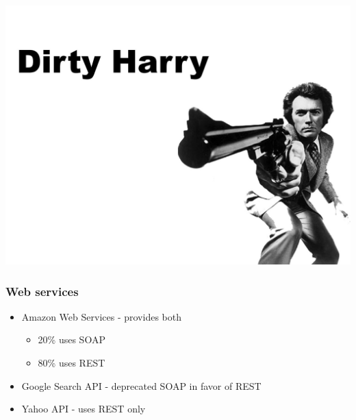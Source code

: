 \begin{frame}[plain]
  \begin{changemargin}{-1cm}{-1cm}
    \begin{center}
      \includegraphics[width=\paperwidth, height=\paperheight, keepaspectratio]{images/dirty-harry.jpg}
    \end{center}
  \end{changemargin}
\end{frame}

\begin{frame}
  \frametitle{Web services}
  \begin{itemize}
  \item Amazon Web Services - provides both
    \begin{itemize}
    \item 20\% uses SOAP
    \item 80\% uses REST
    \end{itemize}
  \item Google Search API - deprecated SOAP in favor of REST
  \item Yahoo API - uses REST only
  \end{itemize}
\end{frame}
